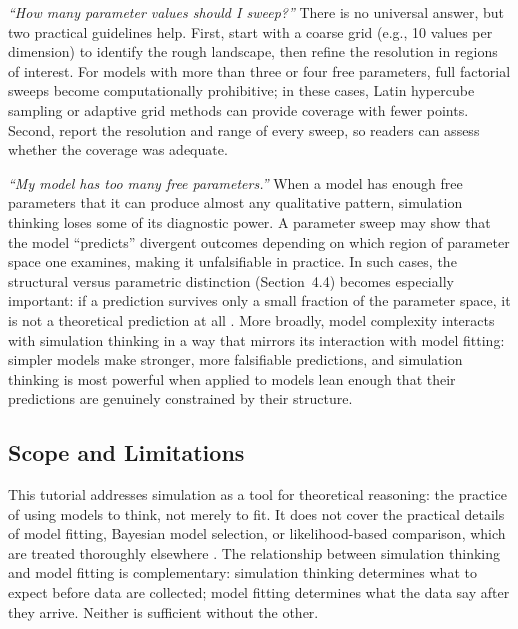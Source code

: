 \documentclass[fleqn,10pt]{wlscirep}
\begin{document}
\begin{linenumbers}
\emph{``How many parameter values should I sweep?''} There is no universal answer, but two practical guidelines help. First, start with a coarse grid (e.g., 10 values per dimension) to identify the rough landscape, then refine the resolution in regions of interest. For models with more than three or four free parameters, full factorial sweeps become computationally prohibitive; in these cases, Latin hypercube sampling or adaptive grid methods can provide coverage with fewer points. Second, report the resolution and range of every sweep, so readers can assess whether the coverage was adequate.

\emph{``My model has too many free parameters.''} When a model has enough free parameters that it can produce almost any qualitative pattern, simulation thinking loses some of its diagnostic power. A parameter sweep may show that the model ``predicts'' divergent outcomes depending on which region of parameter space one examines, making it unfalsifiable in practice. In such cases, the structural versus parametric distinction (Section~4.4) becomes especially important: if a prediction survives only a small fraction of the parameter space, it is not a theoretical prediction at all \citep{pitt2002toward}. More broadly, model complexity interacts with simulation thinking in a way that mirrors its interaction with model fitting: simpler models make stronger, more falsifiable predictions, and simulation thinking is most powerful when applied to models lean enough that their predictions are genuinely constrained by their structure.

\subsection{Scope and Limitations}

This tutorial addresses simulation as a tool for theoretical reasoning: the practice of using models to think, not merely to fit. It does not cover the practical details of model fitting, Bayesian model selection, or likelihood-based comparison, which are treated thoroughly elsewhere \citep{wilson2019ten, farrell2018computational, lee2013bayesian, myung2003tutorial}. The relationship between simulation thinking and model fitting is complementary: simulation thinking determines what to expect before data are collected; model fitting determines what the data say after they arrive. Neither is sufficient without the other.


\end{linenumbers}
\end{document}
